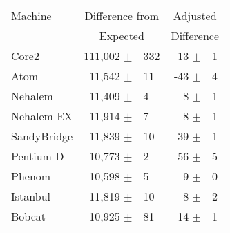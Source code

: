 %
%
%
\begin{tabular}{|l||rl|rl|}

\hline
Machine   & \multicolumn{2}{c|}{Difference from} & \multicolumn{2}{c|}{Adjusted} \\
          & \multicolumn{2}{c|}{Expected} & \multicolumn{2}{c|}{Difference} \\
\hline
\hline

Core2          & 111,002 $\pm$ & 332         &        13 $\pm$ & 1 \\
\hline
Atom           & 11,542 $\pm$ & 11           &       -43 $\pm$ & 4 \\
\hline
Nehalem        & 11,409 $\pm$ & 4            &         8 $\pm$ & 1 \\
\hline
Nehalem-EX     & 11,914 $\pm$ & 7            &         8 $\pm$ & 1 \\
\hline
SandyBridge    & 11,839 $\pm$ & 10           &        39 $\pm$ & 1 \\
\hline
Pentium D      & 10,773 $\pm$ & 2            &       -56 $\pm$ & 5 \\
\hline
Phenom         & 10,598 $\pm$ & 5            &         9 $\pm$ & 0 \\
\hline
Istanbul       & 11,819 $\pm$ & 10           &        8 $\pm$ & 2  \\
\hline
Bobcat         & 10,925 $\pm$ & 81           &       14 $\pm$ & 1  \\
\hline
\end{tabular}

